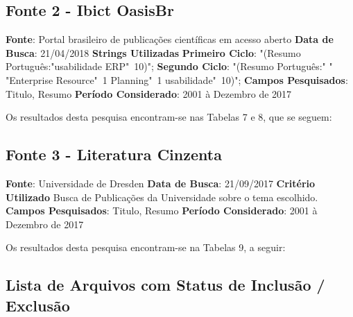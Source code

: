 \subsection{Fonte 2 - Ibict OasisBr}\newline
\newline
\noindent \textbf{Fonte}: Portal brasileiro de publicações científicas em acesso aberto\newline
\noindent \textbf{Data de Busca}: 21/04/2018\newline
\noindent \textbf{Strings Utilizadas}\newline
\indent \textbf{Primeiro Ciclo}: "(Resumo Português:"usabilidade ERP"~10)";\newline
\indent \textbf{Segundo  Ciclo}: "(Resumo Português:" " "Enterprise Resource"~1 Planning"~1 usabilidade"~10)";
\newline
\noindent \textbf{Campos Pesquisados}: Titulo, Resumo \newline
\noindent \textbf{Período Considerado}: 2001 à Dezembro de 2017 \newline

Os resultados desta pesquisa encontram-se nas Tabelas 7 e 8, que se seguem:



\subsection{Fonte 3 - Literatura Cinzenta}\newline
\newline
\noindent \textbf{Fonte}: Universidade de Dresden\newline
\noindent \textbf{Data de Busca}: 21/09/2017\newline
\noindent \textbf{Critério Utilizado}\newline
\indent Busca de Publicações da Universidade sobre o tema escolhido.
\newline
\noindent \textbf{Campos Pesquisados}: Titulo, Resumo \newline
\noindent \textbf{Período Considerado}: 2001 à Dezembro de 2017 \newline

Os resultados desta pesquisa encontram-se na Tabelas 9, a seguir:



\subsection{Lista de Arquivos com Status de Inclusão / Exclusão}

